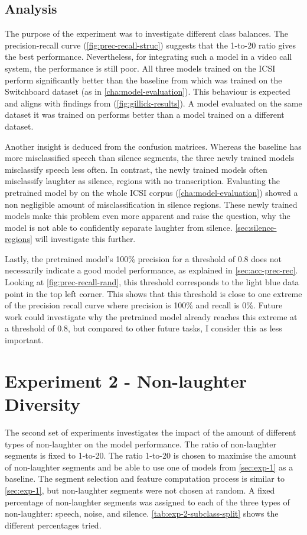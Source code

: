 \documentclass[bsc,frontabs,parskip,deptreport]{infthesis}
\begin{document}
\subsection{Analysis} 
The purpose of the experiment was to investigate different class balances. 
The precision-recall curve (\autoref{fig:prec-recall-struc}) suggests that the 1-to-20 ratio gives the best performance. Nevertheless, for integrating such a model in a video call system, the performance is still poor. 
All three models trained on the ICSI perform significantly better than the baseline from \citet{gillick2021robust} which was trained on the Switchboard dataset (as in \autoref{cha:model-evaluation}).
This behaviour is expected and aligns with findings from \citet{gillick2021robust} (\autoref{fig:gillick-results}). A model evaluated on the same dataset it was trained on performs better than a model trained on a different dataset. 

Another insight is deduced from the confusion matrices. Whereas the baseline has more misclassified speech than silence segments, the three newly trained models misclassify speech less often. 
In contrast, the newly trained models often misclassify laughter as silence, regions with no transcription.
Evaluating the pretrained model by \citet{gillick2021robust} on the whole ICSI corpus (\autoref{cha:model-evaluation}) showed a non negligible amount of misclassification in silence regions. 
These newly trained models make this problem even more apparent and raise the question, why the model is not able to confidently separate laughter from silence. \autoref{sec:silence-regions} will investigate this further.

Lastly, the pretrained model's 100\% precision for a threshold of 0.8 does not necessarily indicate a good model performance, as explained in \autoref{sec:acc-prec-rec}. Looking at \autoref{fig:prec-recall-rand}, this threshold corresponds to the light blue data point in the top left corner. This shows that this threshold is close to one extreme of the precision recall curve where precision is 100\% and recall is 0\%. Future work could investigate why the pretrained model already reaches this extreme at a threshold of 0.8, but compared to other future tasks, I consider this as less important.

\section{Experiment 2 - Non-laughter Diversity} \label{sec:exp2}
The second set of experiments investigates the impact of the amount of different types of non-laughter on the model performance. 
The ratio of non-laughter segments is fixed to 1-to-20. The ratio 1-to-20 is chosen to maximise the amount of non-laughter segments and be able to use one of models from \autoref{sec:exp-1} as a baseline.
The segment selection and feature computation process is similar to \autoref{sec:exp-1}, but non-laughter segments were not chosen at random. A fixed percentage of non-laughter segments was assigned to each of the three types of non-laughter: speech, noise, and silence.
\autoref{tab:exp-2-subclass-split} shows the different percentages tried.
\end{document}
